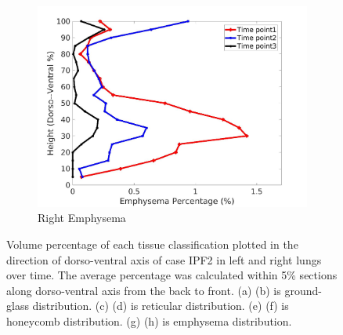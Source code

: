 \begin{figure}[H]
\begin{subfigure}{.4\linewidth}
  \includegraphics[width=\linewidth,trim={{.0\wd0} {.0\wd0} {.0\wd0} {.0\wd0}},clip]{Appendix/Image_AppexA/DorsoToVentral/IPF2RightLungEmphysemaDiseaseDorsoToVentral.jpg}
  \caption{Right Emphysema}
  \label{fig:IPF2DiseaseDorsoToVentral-h}
\end{subfigure}
\caption{Volume percentage of each tissue classification plotted in the direction of dorso-ventral axis of case IPF2 in left and right lungs over time. The average percentage was calculated within 5\% sections along dorso-ventral axis from the back to front. (a) (b) is ground-glass distribution. (c) (d) is reticular distribution. (e) (f) is honeycomb distribution. (g) (h) is emphysema distribution.}
\label{fig:IPF2DiseaseDorsoToVentral}
\end{figure}

